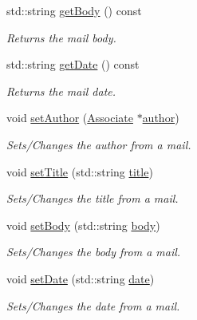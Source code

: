 \begin{DoxyCompactItemize}
std\+::string \hyperlink{classMail_af89b1b3d0f3c9d92a272c06f18fbdec3}{get\+Body} () const
\begin{DoxyCompactList}\small\item\em Returns the mail body. \end{DoxyCompactList}\item 
std\+::string \hyperlink{classMail_ac45841e601864ec3f84566c3ee77de9a}{get\+Date} () const
\begin{DoxyCompactList}\small\item\em Returns the mail date. \end{DoxyCompactList}\item 
void \hyperlink{classMail_acec00cbed8830746de97efeca4561dd8}{set\+Author} (\hyperlink{classAssociate}{Associate} $\ast$\hyperlink{classMail_acfe110a866f8cc54120d4f4ab0f8321b}{author})
\begin{DoxyCompactList}\small\item\em Sets/\+Changes the author from a mail. \end{DoxyCompactList}\item 
void \hyperlink{classMail_aa57f6b5a2f81ded349476984c361275b}{set\+Title} (std\+::string \hyperlink{classMail_a2f54f71a529dec6345d84ae60562b207}{title})
\begin{DoxyCompactList}\small\item\em Sets/\+Changes the title from a mail. \end{DoxyCompactList}\item 
void \hyperlink{classMail_a85ddf08af27648cc0835d66bd6b08dde}{set\+Body} (std\+::string \hyperlink{classMail_aaa91a94ee92b2712218a9cae389554f7}{body})
\begin{DoxyCompactList}\small\item\em Sets/\+Changes the body from a mail. \end{DoxyCompactList}\item 
void \hyperlink{classMail_ac5c8d190278b895b2de786be431b0a30}{set\+Date} (std\+::string \hyperlink{classMail_aee9bc87682f6173b92bf135397f38162}{date})
\begin{DoxyCompactList}\small\item\em Sets/\+Changes the date from a mail. \end{DoxyCompactList}\end{DoxyCompactItemize}
